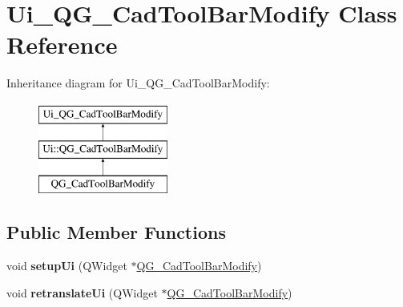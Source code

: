 \hypertarget{classUi__QG__CadToolBarModify}{\section{Ui\-\_\-\-Q\-G\-\_\-\-Cad\-Tool\-Bar\-Modify Class Reference}
\label{classUi__QG__CadToolBarModify}
}
Inheritance diagram for Ui\-\_\-\-Q\-G\-\_\-\-Cad\-Tool\-Bar\-Modify\-:\begin{figure}[H]
\begin{center}
\leavevmode
\includegraphics[height=3.000000cm]{classUi__QG__CadToolBarModify}
\end{center}
\end{figure}
\subsection*{Public Member Functions}
\begin{DoxyCompactItemize}
\item 
\hypertarget{classUi__QG__CadToolBarModify_afcd8eefc06d8499f89d62fe14364faf1}{void {\bfseries setup\-Ui} (Q\-Widget $\ast$\hyperlink{classQG__CadToolBarModify}{Q\-G\-\_\-\-Cad\-Tool\-Bar\-Modify})}\label{classUi__QG__CadToolBarModify_afcd8eefc06d8499f89d62fe14364faf1}

\item 
\hypertarget{classUi__QG__CadToolBarModify_a80836d51a20074f099cef4c7586199df}{void {\bfseries retranslate\-Ui} (Q\-Widget $\ast$\hyperlink{classQG__CadToolBarModify}{Q\-G\-\_\-\-Cad\-Tool\-Bar\-Modify})}\label{classUi__QG__CadToolBarModify_a80836d51a20074f099cef4c7586199df}

\end{DoxyCompactItemize}
